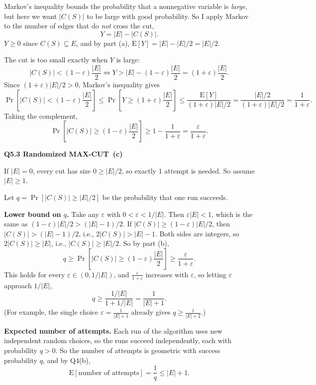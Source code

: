 \documentclass[11pt]{article}
\newcommand{\abs}[1]{\left|#1\right|}
\newcommand{\MaxCut}{\textsf{MAX-CUT}}
\newcommand{\Ex}{\mathrm{E}}
\newcommand{\qpage}[1]{\clearpage\noindent\textbf{\large #1}\par\medskip}
\begin{document}
Markov's inequality bounds the probability that a nonnegative variable is \emph{large}, but here we want $\abs{C(S)}$ to be large with good probability.
So I apply Markov to the number of edges that do \emph{not} cross the cut,
\[
  Y = \abs{E} - \abs{C(S)}.
\]
$Y \geq 0$ since $C(S) \subseteq E$, and by part (a), $\Ex[Y] = \abs{E} - \abs{E}/2 = \abs{E}/2$.

The cut is too small exactly when $Y$ is large:
\[
  \abs{C(S)} < (1-\varepsilon)\frac{\abs{E}}{2}
  \iff Y > \abs{E} - (1-\varepsilon)\frac{\abs{E}}{2} = (1+\varepsilon)\frac{\abs{E}}{2}.
\]
Since $(1+\varepsilon)\abs{E}/2 > 0$, Markov's inequality gives
\[
  \Pr\left[\abs{C(S)} < (1-\varepsilon)\frac{\abs{E}}{2}\right]
  \leq \Pr\left[Y \geq (1+\varepsilon)\frac{\abs{E}}{2}\right]
  \leq \frac{\Ex[Y]}{(1+\varepsilon)\abs{E}/2}
  = \frac{\abs{E}/2}{(1+\varepsilon)\abs{E}/2}
  = \frac{1}{1+\varepsilon}.
\]
Taking the complement,
\[
  \Pr\left[\abs{C(S)} \geq (1-\varepsilon)\frac{\abs{E}}{2}\right] \geq 1 - \frac{1}{1+\varepsilon} = \frac{\varepsilon}{1+\varepsilon}.
\]

\qpage{Q5.3 Randomized \MaxCut\ (c)}

If $\abs{E} = 0$, every cut has size $0 \geq \abs{E}/2$, so exactly $1$ attempt is needed.
So assume $\abs{E} \geq 1$.

Let $q = \Pr[\abs{C(S)} \geq \abs{E}/2]$ be the probability that one run succeeds.

\textbf{Lower bound on $q$.}
Take any $\varepsilon$ with $0 < \varepsilon < 1/\abs{E}$.
Then $\varepsilon\abs{E} < 1$, which is the same as $(1-\varepsilon)\abs{E}/2 > (\abs{E}-1)/2$.
If $\abs{C(S)} \geq (1-\varepsilon)\abs{E}/2$, then $\abs{C(S)} > (\abs{E}-1)/2$, i.e., $2\abs{C(S)} > \abs{E} - 1$.
Both sides are integers, so $2\abs{C(S)} \geq \abs{E}$, i.e., $\abs{C(S)} \geq \abs{E}/2$.
So by part (b),
\[
  q \geq \Pr\left[\abs{C(S)} \geq (1-\varepsilon)\frac{\abs{E}}{2}\right] \geq \frac{\varepsilon}{1+\varepsilon}.
\]
This holds for every $\varepsilon \in (0, 1/\abs{E})$, and $\frac{\varepsilon}{1+\varepsilon}$ increases with $\varepsilon$, so letting $\varepsilon$ approach $1/\abs{E}$,
\[
  q \geq \frac{1/\abs{E}}{1 + 1/\abs{E}} = \frac{1}{\abs{E} + 1}.
\]
(For example, the single choice $\varepsilon = \frac{1}{\abs{E}+1}$ already gives $q \geq \frac{1}{\abs{E}+2}$.)

\textbf{Expected number of attempts.}
Each run of the algorithm uses new independent random choices, so the runs succeed independently, each with probability $q > 0$.
So the number of attempts is geometric with success probability $q$, and by Q4(b),
\[
  \Ex[\text{number of attempts}] = \frac{1}{q} \leq \abs{E} + 1.
\]
\end{document}
